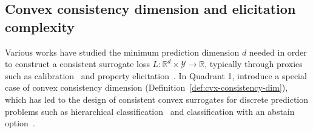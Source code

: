 \documentclass[anon,12pt]{colt2021} %
\newcommand{\Comments}{1}
\newcommand{\mytodo}[2]{\ifnum\Comments=1%
	\todo[linecolor=#1!80!black,backgroundcolor=#1,bordercolor=#1!80!black]{#2}\fi}
\newcommand{\raft}[1]{\mytodo{green!20!white}{RF: #1}}
\newcommand{\jessiet}[1]{\mytodo{purple!20!white}{JF: #1}}
\newcommand{\reals}{\mathbb{R}}
\newcommand{\Y}{\mathcal{Y}}
\begin{document}


\subsection{Convex consistency dimension and elicitation complexity}\label{subsec:complexity}

Various works have studied the minimum prediction dimension $d$ needed in order to construct a consistent surrogate loss $L: \reals^d \times \Y \to \reals$, typically through proxies such as calibration~\citep{steinwart2008support,agarwal2015consistent,ramaswamy2016convex} and property elicitation~\citep{frongillo2015vector-valued,fissler2016higher,frongillo2020elicitation}.
In Quadrant 1, \citet{ramaswamy2016convex} introduce a special case of convex consistency dimension (Definition~\ref{def:cvx-consistency-dim}), which has led to the design of consistent convex surrogates for discrete prediction problems such as hierarchical classification~\citep{ramaswamy2015hierarchical} and classification with an abstain option~\citep{ramaswamy2018consistent}.

\end{document}

